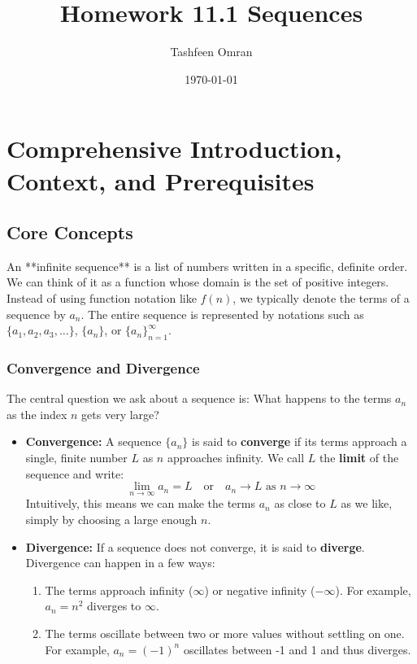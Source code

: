 \documentclass{article}
\title{Homework 11.1 Sequences}
\author{Tashfeen Omran}
\date{\today}
\begin{document}
\maketitle

\section{Comprehensive Introduction, Context, and Prerequisites}

\subsection{Core Concepts}
An **infinite sequence** is a list of numbers written in a specific, definite order. We can think of it as a function whose domain is the set of positive integers. Instead of using function notation like $f(n)$, we typically denote the terms of a sequence by $a_n$. The entire sequence is represented by notations such as $\{a_1, a_2, a_3, \dots\}$, $\{a_n\}$, or $\{a_n\}_{n=1}^{\infty}$.

\subsubsection{Convergence and Divergence}
The central question we ask about a sequence is: What happens to the terms $a_n$ as the index $n$ gets very large?

\begin{itemize}
    \item \textbf{Convergence:} A sequence $\{a_n\}$ is said to \textbf{converge} if its terms approach a single, finite number $L$ as $n$ approaches infinity. We call $L$ the \textbf{limit} of the sequence and write:
    \[ \lim_{n \to \infty} a_n = L \quad \text{or} \quad a_n \to L \text{ as } n \to \infty \]
    Intuitively, this means we can make the terms $a_n$ as close to $L$ as we like, simply by choosing a large enough $n$.

    \item \textbf{Divergence:} If a sequence does not converge, it is said to \textbf{diverge}. Divergence can happen in a few ways:
    \begin{enumerate}
        \item The terms approach infinity ($\infty$) or negative infinity ($-\infty$). For example, $a_n = n^2$ diverges to $\infty$.
        \item The terms oscillate between two or more values without settling on one. For example, $a_n = (-1)^n$ oscillates between -1 and 1 and thus diverges.
    \end{enumerate}
\end{itemize}
\end{document}
